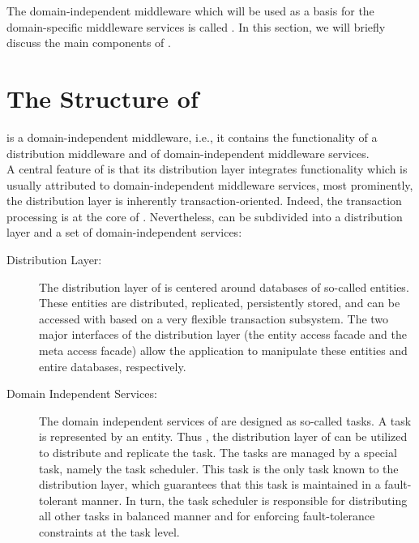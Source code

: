\documentclass[a4paper, 10pt]{book}
\begin{document}
                The domain-independent middleware which will be used as a basis for the
                domain-specific middleware services is called \SYNEIGHT. In this section,
                we will briefly discuss the main components of \SYNEIGHT. 


                \section{The Structure of \SYNEIGHT}


                \SYNEIGHT is a domain-independent middleware, i.e., it contains the
                functionality of a distribution middleware and of domain-independent
                middleware services.\\
                A central feature of \SYNEIGHT is that its distribution layer integrates
                functionality which is usually attributed to domain-independent
                middleware services, most prominently, the distribution layer is
                inherently transaction-oriented. Indeed, the transaction processing is
                at the core of \SYNEIGHT. Nevertheless, \SYNEIGHT can be subdivided into a
                distribution layer and a set of domain-independent services:
                \begin{description}
                    \item[Distribution Layer:] The distribution layer of \SYNEIGHT is centered
                        around databases of so-called entities. These entities are
                        distributed, replicated, persistently stored, and can be accessed
                        with based on a very flexible transaction subsystem. The two major
                        interfaces of the distribution layer (the entity access facade and
                        the meta access facade) allow the application to manipulate these
                        entities and entire databases, respectively.
                    \item[Domain Independent Services:] The domain independent services of
                        \SYNEIGHT are designed as so-called tasks. A task is represented by an
                        entity. Thus , the distribution layer of \SYNEIGHT can be utilized to
                        distribute and replicate the task. The tasks are managed by a
                        special task, namely the task scheduler. This task is the only task
                        known to the distribution layer, which guarantees that this task is
                        maintained in a fault-tolerant manner. In turn, the task scheduler
                        is responsible for distributing all other tasks in balanced manner
                        and for enforcing fault-tolerance constraints at the task level.
                \end{description}
\end{document}
